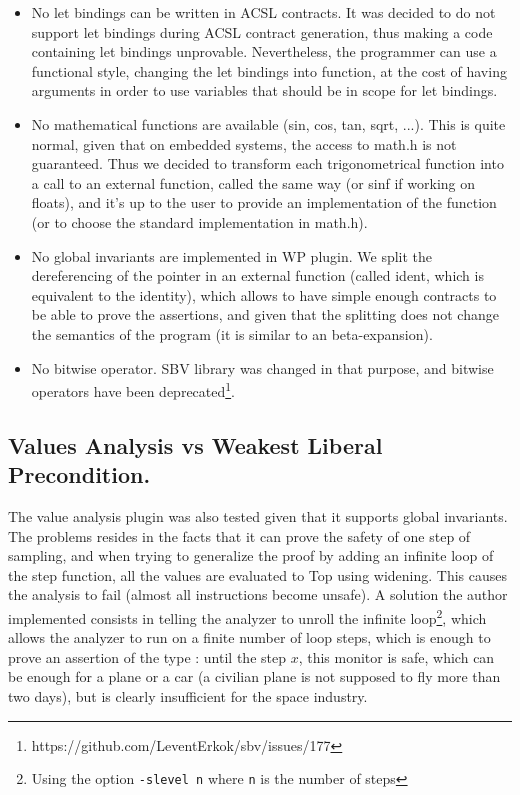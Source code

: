 \documentclass[a4paper,11pt,final]{article}
\begin{document}
	\begin{itemize}
		\item No let bindings can be written in ACSL contracts.
		\subitem It was decided to do not support let bindings during ACSL contract generation, thus making a code containing let bindings unprovable. Nevertheless, the programmer can use a functional style, changing the let bindings into function, at the cost of having arguments in order to use variables that should be in scope for let bindings.
		\item No mathematical functions are available (sin, cos, tan, sqrt, ...).
		\subitem This is quite normal, given that on embedded systems, the access to math.h is not guaranteed. Thus we decided to transform each trigonometrical function into a call to an external function, called the same way (or sinf if working on floats), and it's up to the user to provide an implementation of the function (or to choose the standard implementation in math.h).
		\item No global invariants are implemented in WP plugin.
		\subitem We split the dereferencing of the pointer in an external function (called ident, which is equivalent to the identity), which allows to have simple enough contracts to be able to prove the assertions, and given that the splitting does not change the semantics of the program (it is similar to an beta-expansion).
		\item No bitwise operator.
		\subitem SBV library was changed in that purpose, and bitwise operators have been deprecated\footnote{https://github.com/LeventErkok/sbv/issues/177}.
	\end{itemize}
	
	\subsection{Values Analysis vs Weakest Liberal Precondition.}
	The value analysis plugin was also tested given that it supports global invariants. The problems resides in the facts that it can prove the safety of one step of sampling, and when trying to generalize the proof by adding an infinite loop of the step function, all the values are evaluated to Top using widening. This causes the analysis to fail (almost all instructions become unsafe). A solution the author implemented consists in telling the analyzer to unroll the infinite loop\footnote{Using the option \texttt{-slevel n} where \texttt{n} is the number of steps}, which allows the analyzer to run on a finite number of loop steps, which is enough to prove an assertion of the type : until the step $x$, this monitor is safe, which can be enough for a plane or a car (a civilian plane is not supposed to fly more than two days), but is clearly insufficient for the space industry.
	
\end{document}
